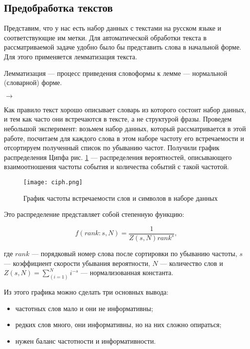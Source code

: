 \subsection{Предобработка текстов}

Представим, что у нас есть набор данных с текстами на русском языке и соответствующие им метки. Для автоматической обработки текста в рассматриваемой задаче удобно было бы представить слова в начальной форме. Для этого применяется лемматизация текста.

\begin{definition}
 Лемматизация --- процесс приведения словоформы к лемме --- нормальной (словарной) форме.
\end{definition}

\bigskip
{} $\to$ 

\bigskip
Как правило текст хорошо описывает словарь из которого состоит набор данных, и тем как часто они встречаются в тексте, а не структурой фразы. Проведем небольшой эксперимент: возьмем набор данных, который рассматривается в этой работе, посчитаем для каждого слова в этом наборе частоту его встречаемости и отсортируем полученный список по убыванию частот. Получили график распределения Ципфа рис. \ref{fig:ciph} --- распределения вероятностей, описывающего взаимоотношения частоты события и количества событий с такой частотой.

\begin{figure}[ht]
    \centering
    \texttt{[image: ciph.png]}
    \caption{График частоты встречаемости слов и символов в наборе данных}
    \label{fig:ciph}
\end{figure}

\bigskip\noindent
Это распределение представляет собой степенную функцию:

\begin{equation*}
 f(rank:s,N) = \frac{1}{Z(s,N)rank^s},
\end{equation*}

\bigskip
где $rank$ --- порядковый номер слова после сортировки по убыванию частоты, $s$ --- коэффициент скорости убывания вероятности, $N$ --- количество слов и $Z(s,N)= \sum_(i=1)^N i^{-s}$ --- нормализованная константа.

\bigskip\noindent
Из этого графика можно сделать три основных вывода:

\bigskip
\begin{itemize}
 \item частотных слов мало и они не информативны;
 \item редких слов много, они информативны, но на них сложно опираться;
 \item нужен баланс частотности и информативности.
\end{itemize}

